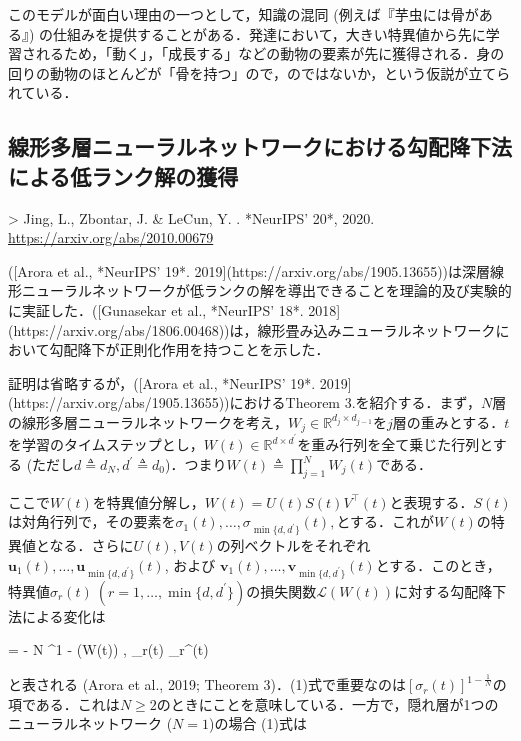 このモデルが面白い理由の一つとして，知識の混同 (例えば『芋虫には骨がある』) の仕組みを提供することがある．発達において，大きい特異値から先に学習されるため，「動く」，「成長する」などの動物の要素が先に獲得される．身の回りの動物のほとんどが「骨を持つ」ので，\textbf{}のではないか，という仮説が立てられている．
\subsection{線形多層ニューラルネットワークにおける勾配降下法による低ランク解の獲得}

> Jing, L., Zbontar, J. & LeCun, Y. \textbf{}. *NeurIPS' 20*, 2020. \url{https://arxiv.org/abs/2010.00679}

([Arora et al., *NeurIPS' 19*. 2019](https://arxiv.org/abs/1905.13655))は深層線形ニューラルネットワークが低ランクの解を導出できることを理論的及び実験的に実証した．([Gunasekar et al., *NeurIPS' 18*. 2018](https://arxiv.org/abs/1806.00468))は，線形畳み込みニューラルネットワークにおいて勾配降下が正則化作用を持つことを示した．

証明は省略するが，([Arora et al., *NeurIPS' 19*. 2019](https://arxiv.org/abs/1905.13655))におけるTheorem 3.を紹介する．まず，$N$層の線形多層ニューラルネットワークを考え，$W_j \in \mathbb{R}^{d_j \times d_{j−1}}$を$j$層の重みとする．$t$を学習のタイムステップとし，$W(t) \in \mathbb{R}^{d \times d^\prime}$を重み行列を全て乗じた行列とする (ただし$d \triangleq d_N, d^\prime \triangleq d_0$)．つまり$W(t)\triangleq\prod_{j=1}^N W_j(t)$である．

ここで$W(t)$を特異値分解し，$W(t) = U(t)S(t)V^\top(t)$と表現する．$S(t)$は対角行列で，その要素を$\sigma_1(t), \ldots , \sigma_{\min\{d, d^\prime\}}(t),$とする．これが$W(t)$の特異値となる．さらに$U(t), V (t)$の列ベクトルをそれぞれ $\mathbf{u}_1(t), \ldots, \mathbf{u}_{\min\{d, d^\prime\}}(t)$, および $\mathbf{v}_1(t), \ldots, \mathbf{v}_{\min\{d,d^\prime \}}(t)$とする．このとき，特異値$ \sigma_r(t)\ (r=1, \ldots, \min\{d,d^\prime \})$の損失関数$\mathcal{L}(W(t))$に対する勾配降下法による変化は


 = - N \cdot {}^{1 - } \cdot \left\langle \nabla {}(W(t)) , _r(t) _r^\top(t) \right\rangle


と表される (Arora et al., 2019; Theorem 3)．(1)式で重要なのは$\left[\sigma_r(t)\right]^{1 - \frac{1}{N}}$の項である．これは$N\geq 2$のときに\textbf{}ことを意味している．一方で，隠れ層が1つのニューラルネットワーク ($N=1$)の場合 (1)式は


